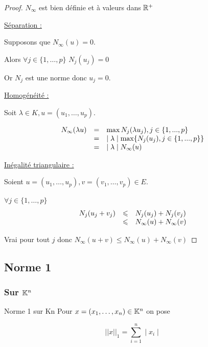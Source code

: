 \begin{proof}
    $N_\infty$ est bien définie et à valeurs dans $\mathbb{R}^+$

    \quad \underline{Séparation : }

    Supposons que $N_\infty(u) = 0$. 

    Alors $\forall j \in \{1, \dots, p\}$ $N_j(u_j) = 0$

    Or $N_j$ est une norme donc $u_j = 0$. 

    \quad \underline{Homogénéité : }

    Soit $\lambda \in K, u = (u_1, \dots, u_p)$. 

    \[
    \begin{array}{rcl}
        N_\infty(\lambda u) & = & \max{N_j(\lambda u_j), j \in \{1, ..., p\}} \\
        \space & = & \mid \lambda \mid \max\{N_j(u_j), j \in \{1, ..., p\}\} \\
        \space & = & \mid \lambda \mid N_\infty(u) \\
    \end{array}
    \]

    \quad \underline{Inégalité triangulaire : }

    Soient $u = (u_1, \dots, u_p), v = (v_1, \dots, v_p) \in E$. 


    $\forall j \in \{1, \dots, p\}$
    \[
        \begin{array}{rcl}
            N_j(u_j + v_j) & \leqslant & N_j(u_j) + N_j(v_j) \\
            \space & \leqslant & N_\infty(u) + N_\infty(v) \\
        \end{array}
    \]

    Vrai pour tout $j$ donc $N_\infty(u + v) \leqslant N_\infty(u) + N_\infty(v)$
\end{proof}

\subsection{Norme 1}

\subsubsection{Sur \texorpdfstring{$\mathbb{K}^n$}{kn}}

\begin{definition}{Norme 1 sur Kn}{}
    Pour $x = (x_1, \dots, x_n) \in \mathbb{K}^n$ on pose 

    $$||x||_1 = \sum_{i = 1 }^{n } \mid x_i\mid$$
\end{definition}

